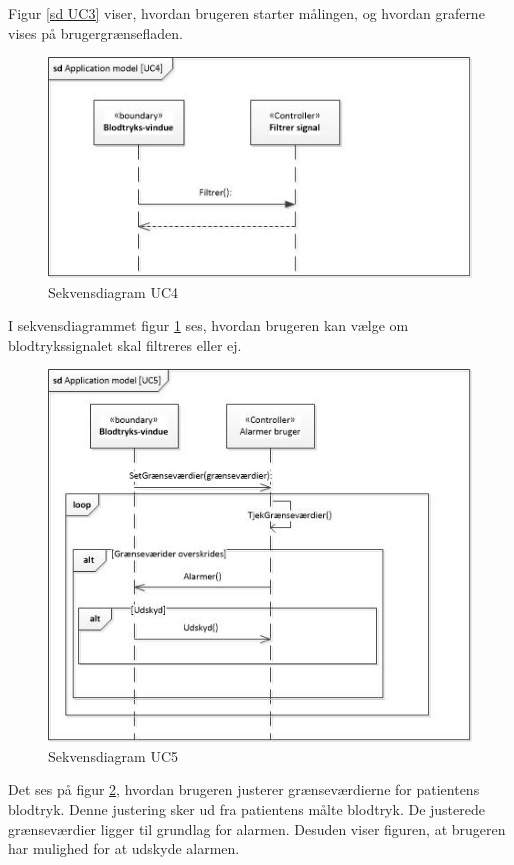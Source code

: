 Figur \ref{sd UC3} viser, hvordan brugeren starter målingen, og hvordan graferne vises på brugergrænsefladen.

\begin{figure}[H]
	\includegraphics[width=1\textwidth]{Figurer/ISE/sdAppModelUC4}
	\caption{Sekvensdiagram UC4}
	\label{sd UC4}
\end{figure}

I sekvensdiagrammet figur \ref{sd UC4} ses, hvordan brugeren kan vælge om blodtrykssignalet skal filtreres eller ej.

\begin{figure}[H]
	\includegraphics[width=1\textwidth]{Figurer/ISE/sdAppModelUC5}
	\caption{Sekvensdiagram UC5}
	\label{sd UC5}
\end{figure}

Det ses på figur \ref{sd UC5}, hvordan brugeren justerer grænseværdierne for patientens blodtryk. Denne justering sker ud fra patientens målte blodtryk. De justerede grænseværdier ligger til grundlag for alarmen. Desuden viser figuren, at brugeren har mulighed for at udskyde alarmen.

